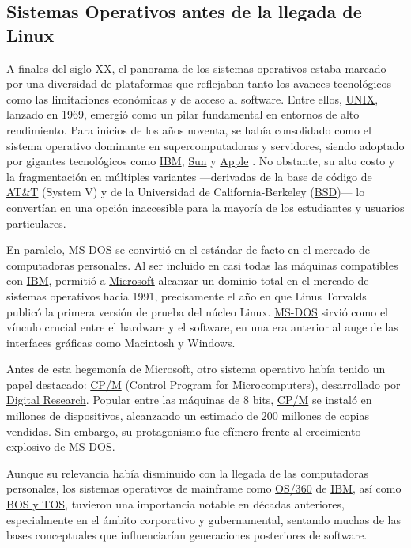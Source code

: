 \documentclass[a4paper,12pt]{article}
\begin{document}
\subsection{Sistemas Operativos antes de la llegada de Linux}
A finales del siglo XX, el panorama de los sistemas operativos estaba marcado
por una diversidad de plataformas que reflejaban tanto los avances tecnológicos
como las limitaciones económicas y de acceso al software. Entre ellos, \hyperref[unix]{UNIX},
lanzado en 1969, emergió como un pilar fundamental en entornos de alto
rendimiento. Para inicios de los años noventa, se había consolidado como el
sistema operativo dominante en supercomputadoras y servidores, siendo adoptado
por gigantes tecnológicos como \hyperref[ibm]{IBM}, \hyperref[sun]{Sun} y \hyperref[apple]{Apple} . 
No obstante, su alto costo y la
fragmentación en múltiples variantes —derivadas de la base de código de \hyperref[att]{AT\&T} 
(System V) y de la Universidad de California-Berkeley (\hyperref[bsd]{BSD})— lo convertían en
una opción inaccesible para la mayoría de los estudiantes y usuarios
particulares.

En paralelo, \hyperref[msdos]{MS-DOS} se convirtió en el estándar de facto en el mercado de
computadoras personales. Al ser incluido en casi todas las máquinas compatibles
con \hyperref[ibm]{IBM}, permitió a \hyperref[microsoft]{Microsoft} alcanzar un dominio total en el mercado de
sistemas operativos hacia 1991, precisamente el año en que Linus Torvalds
publicó la primera versión de prueba del núcleo Linux. \hyperref[msdos]{MS-DOS} sirvió como el
vínculo crucial entre el hardware y el software, en una era anterior al auge de
las interfaces gráficas como Macintosh y Windows.

Antes de esta hegemonía de Microsoft, otro sistema operativo había tenido un
papel destacado: \hyperref[cpm]{CP/M} (Control Program for Microcomputers), desarrollado por
\hyperref[digitalresearch]{Digital Research}. Popular entre las máquinas de 8 bits, \hyperref[cpm]{CP/M} se instaló en
millones de dispositivos, alcanzando un estimado de 200 millones de copias
vendidas. Sin embargo, su protagonismo fue efímero frente al crecimiento
explosivo de \hyperref[msdos]{MS-DOS}.

Aunque su relevancia había disminuido con la llegada de las
computadoras personales, los sistemas operativos de mainframe como \hyperref[os360]{OS/360} de
\hyperref[ibm]{IBM}, así como \hyperref[bostos]{BOS y TOS}, tuvieron una importancia notable en décadas anteriores,
especialmente en el ámbito corporativo y gubernamental, sentando muchas de las
bases conceptuales que influenciarían generaciones posteriores de software.
\end{document}
